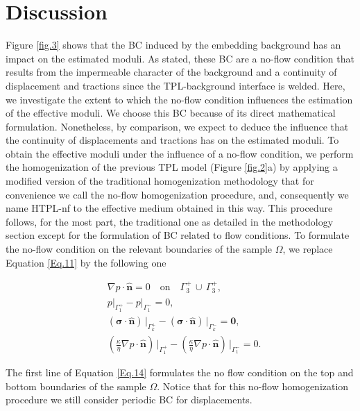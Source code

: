 \documentclass[draft]{agujournal2019}
\begin{document}
\section{Discussion}
Figure \ref{fig.3} shows that the BC induced by the embedding background has an impact on the estimated moduli. As stated,  these BC are a no-flow condition that results from the impermeable character of the background and a continuity of displacement and tractions since the TPL-background interface is welded. Here, we investigate the extent to which the no-flow condition influences the estimation of the effective moduli. We choose this BC because of its direct mathematical formulation. Nonetheless, by comparison, we expect to deduce the influence that the continuity of displacements and tractions has on the estimated moduli. To obtain the effective moduli under the influence of a no-flow condition, we perform the homogenization of the previous TPL model (Figure \ref{fig.2}a) by applying a modified version of the traditional homogenization methodology that for convenience we call the no-flow homogenization procedure, and, consequently we name HTPL-nf to the effective medium obtained in this way. This procedure follows, for the most part, the traditional one as detailed in the methodology section except for the formulation of BC related to flow conditions. To formulate the no-flow condition on the relevant boundaries of the sample $\Omega$, we replace Equation \ref{Eq.11} by the following one
\begin{linenomath*}
\begin{equation}\label{Eq.14}
\begin{split}
& \nabla p \cdot \bm{\hat n}  = 0 \quad \text{on}\quad \Gamma_3^+ \, \cup \, \Gamma_3^+,\\
& p\vert_{\Gamma_1^+}-p\vert_{\Gamma_1^-} =0, \\
& \left(\bm{\sigma}\cdot \bm{\hat n} \right)\, \vert_{\Gamma_k^+}-\left(\bm{\sigma}\cdot \bm{\hat n} \right)\, \vert_{\Gamma_k^-} = \bm{0},\\
&\left( \frac{\kappa}{\eta} \nabla p \cdot \bm{\hat n} \right) \, \vert_{\Gamma_1^+} -\left( \frac{\kappa}{\eta} \nabla p \cdot \bm{\hat n} \right) \, \vert_{\Gamma_1^-} = 0.
\end{split}
\end{equation}
\end{linenomath*}
The first line of Equation \eqref{Eq.14} formulates the no flow condition on the top and bottom boundaries of the sample $\Omega$. Notice that for this no-flow homogenization procedure we still consider periodic BC for displacements. 
\end{document}
